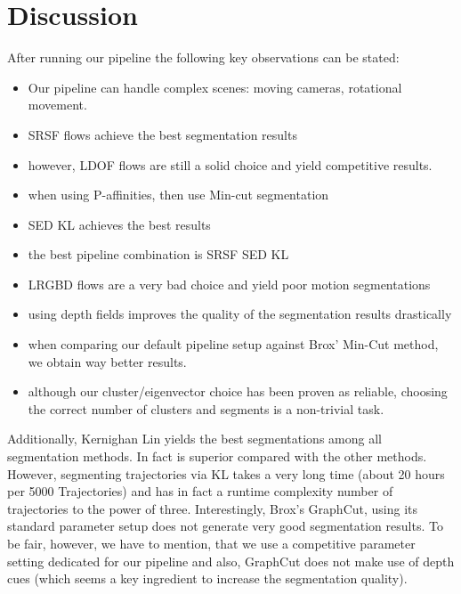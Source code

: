 \section{Discussion}
After running our pipeline the following key observations can be stated:
\begin{itemize}
  \item Our pipeline can handle complex scenes: moving cameras, rotational movement.
  \item SRSF flows achieve the best segmentation results
  \item however, LDOF flows are still a solid choice and yield competitive results.
  \item when using P-affinities, then use Min-cut segmentation
  \item SED KL achieves the best results
  \item the best pipeline combination is SRSF SED KL 
  \item LRGBD flows are a very bad choice and yield poor motion segmentations
  \item using depth fields improves the quality of the segmentation results drastically
  \item when comparing our default pipeline setup against Brox' Min-Cut method, we obtain way better results.
  \item although our cluster/eigenvector choice has been proven as reliable, choosing the correct number of clusters and segments is a non-trivial task.
\end{itemize}


Additionally, Kernighan Lin yields the best segmentations among all segmentation methods. In fact is superior compared with the other methods. However, segmenting trajectories via KL takes a very long time (about 20 hours per 5000 Trajectories) and has in fact a runtime complexity number of trajectories to the power of three. Interestingly, Brox's GraphCut, using its standard parameter setup does not generate very good segmentation results. To be fair, however, we have to mention, that we use a competitive parameter setting dedicated for our pipeline and also, GraphCut does not make use of depth cues (which seems a key ingredient to increase the segmentation quality).










